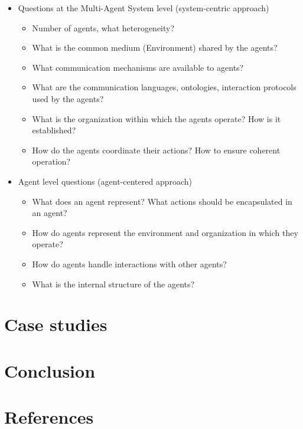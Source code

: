 \documentclass[conference]{IEEEtran}
\begin{document}
\begin{itemize}
    \item Questions at the Multi-Agent System level (system-centric approach)
    \begin{itemize}
        \item Number of agents, what heterogeneity?
        \item What is the common medium (Environment) shared by the agents?
        \item What communication mechanisms are available to agents?
        \item What are the communication languages, ontologies, interaction protocols used by the agents?
        \item What is the organization within which the agents operate? How is it established?
        \item How do the agents coordinate their actions? How to ensure coherent operation?
    \end{itemize}

    \item Agent level questions (agent-centered approach)
    \begin{itemize}
        \item What does an agent represent? What actions should be encapsulated in an agent?
        \item How do agents represent the environment and organization in which they operate?
        \item How do agents handle interactions with other agents?
        \item What is the internal structure of the agents?
    \end{itemize}
\end{itemize}

\section{Case studies}


\section{Conclusion}


\section*{References}

% 



\end{document}
